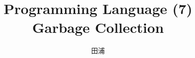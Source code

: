 \documentclass[11pt,dvipdfmx]{beamer}
\title{Programming Language (7) \\
Garbage Collection}
\institute{}
\author{田浦}
\date{}
\newif\ifja
\newif\ifeng
\newcommand{\ao}[1]{{\color{blue}#1}}
\begin{document}
\maketitle

\ifja
\begin{frame}
\frametitle{目次}
\tableofcontents
\end{frame}
\fi
\ifeng
\begin{frame}
\frametitle{Contents}
\tableofcontents
\end{frame}
\fi

\ifja
\section{GCの良し悪しの基準}
\fi
\ifeng
\section{Criteria of evaluating GCs (RC vs. traversing)}
\fi
\ifja
\begin{frame}
\frametitle{GCの良し悪しの基準}
\begin{enumerate}
\item \ao{正確さ:} 
  \begin{itemize}
  \item 回収可能なゴミの範囲が広いか
  \end{itemize}
\item \ao{メモリ割り当てコスト:} 
  \begin{itemize}
  \item メモリ割当をするのに必要な(GCを含めた)仕事
  \end{itemize}
\item \ao{mutatorオーバーヘッド:} 
  \begin{itemize}
  \item GCが機能するためにmutatorに課されるオーバーヘッドが少ないか
  \end{itemize}
\item \ao{停止時間(pause time):} 
  \begin{itemize}
  \item GCが機能するためにmutatorが(一時的に)停止
    しなくてはならない時間が短いか
  \end{itemize}
\end{enumerate}
\end{frame}
\fi
\ifeng
\end{document}
